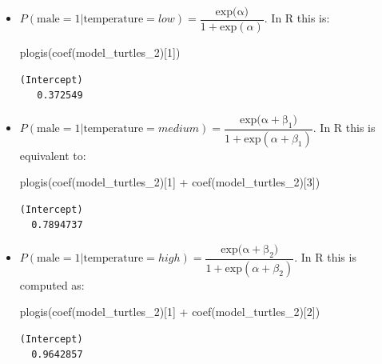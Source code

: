 \documentclass[
  letterpaper,
  DIV=11,
  numbers=noendperiod]{scrartcl}
\newenvironment{Shaded}{\begin{snugshade}}{\end{snugshade}}
\newcommand{\DecValTok}[1]{\textcolor[rgb]{0.68,0.00,0.00}{#1}}
\newcommand{\FunctionTok}[1]{\textcolor[rgb]{0.28,0.35,0.67}{#1}}
\newcommand{\NormalTok}[1]{\textcolor[rgb]{0.00,0.23,0.31}{#1}}
\newcommand{\SpecialCharTok}[1]{\textcolor[rgb]{0.37,0.37,0.37}{#1}}
\begin{document}
\begin{itemize}
\item
  \(P(\mathrm{male}=1|\mathrm{temperature}=low) = \dfrac{\mathrm{\mathrm{exp}(\alpha})}{1 + \mathrm{exp}(\alpha)}.\)
  In R this is:

\begin{Shaded}
\begin{Highlighting}[]
\FunctionTok{plogis}\NormalTok{(}\FunctionTok{coef}\NormalTok{(model\_turtles\_2)[}\DecValTok{1}\NormalTok{])}
\end{Highlighting}
\end{Shaded}

\begin{verbatim}
(Intercept) 
   0.372549 
\end{verbatim}
\item
  \(P(\mathrm{male}=1|\mathrm{temperature}=medium) = \dfrac{\mathrm{\mathrm{exp}(\alpha + \beta_1})}{1 + \mathrm{exp}(\alpha + \beta_1)}.\)
  In R this is equivalent to:

\begin{Shaded}
\begin{Highlighting}[]
\FunctionTok{plogis}\NormalTok{(}\FunctionTok{coef}\NormalTok{(model\_turtles\_2)[}\DecValTok{1}\NormalTok{] }\SpecialCharTok{+} \FunctionTok{coef}\NormalTok{(model\_turtles\_2)[}\DecValTok{3}\NormalTok{])}
\end{Highlighting}
\end{Shaded}

\begin{verbatim}
(Intercept) 
  0.7894737 
\end{verbatim}
\item
  \(P(\mathrm{male}=1|\mathrm{temperature}=high) = \dfrac{\mathrm{\mathrm{exp}(\alpha + \beta_2})}{1 + \mathrm{exp}(\alpha + \beta_2)}\).
  In R this is computed as:

\begin{Shaded}
\begin{Highlighting}[]
\FunctionTok{plogis}\NormalTok{(}\FunctionTok{coef}\NormalTok{(model\_turtles\_2)[}\DecValTok{1}\NormalTok{] }\SpecialCharTok{+} \FunctionTok{coef}\NormalTok{(model\_turtles\_2)[}\DecValTok{2}\NormalTok{])}
\end{Highlighting}
\end{Shaded}

\begin{verbatim}
(Intercept) 
  0.9642857 
\end{verbatim}
\end{itemize}
\end{document}
